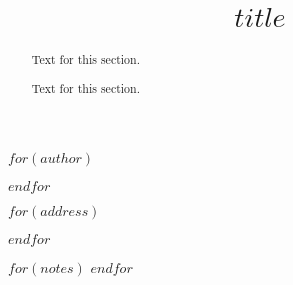 \documentclass{bmcart}
\begin{document}
  \begin{frontmatter}

    \begin{fmbox}
      \title{$title$}

      $for(author)$
      \author[%
        addressref={$author.addressref$}, %
        $if(author.corref)$corref={$author.corref$}, $endif$ %
        $if(author.noteref)$noteref={$author.noteref$}, $endif$ %
        email={$author.email$} %
      ]{ }
      $endfor$

      $for(address)$
      \address[id=$address.id$]{ %
        $if(address.orgname)$ , $endif$ %
        $if(address.street)$ , $endif$ %
        $if(address.postcode)$ , $endif$ %
        $if(address.city)$ , $endif$ %
        $if(address.cny)$ $endif$ %
      }
      $endfor$

      \begin{artnotes}
        $for(notes)$
        $endfor$
      \end{artnotes}

    \end{fmbox}%

    \begin{abstractbox}

      \begin{abstract} %
        Text for this section.

        Text for this section.
      \end{abstract}

      \begin{keyword}
      \end{keyword}

    \end{abstractbox}

  \end{frontmatter}

\end{document}

